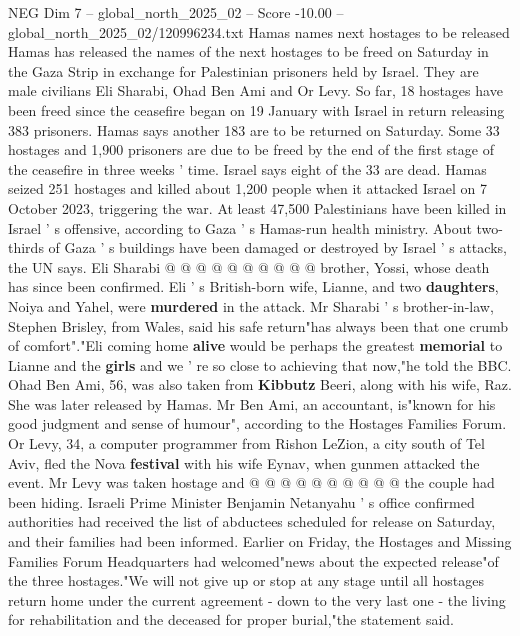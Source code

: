 \begin{textsample}{NEG Dim 7 – global\_north\_2025\_02 – Score -10.00 – global\_north\_2025\_02/120996234.txt}  \label{ex:f7_neg_066}
Hamas names next hostages to be released Hamas has released the names of the next hostages to be freed on Saturday in the Gaza Strip in exchange for Palestinian prisoners held by Israel.
They are male civilians Eli Sharabi, Ohad Ben Ami and Or Levy.
So far, 18 hostages have been freed since the ceasefire began on 19 January with Israel in return releasing 383 prisoners.
Hamas says another 183 are to be returned on Saturday.
Some 33 hostages and 1,900 prisoners are due to be freed by the end of the first stage of the ceasefire in three weeks ' time.
Israel says eight of the 33 are dead.
Hamas seized 251 hostages and killed about 1,200 people when it attacked Israel on 7 October 2023, triggering the war.
At least 47,500 Palestinians have been killed in Israel ' s offensive, according to Gaza ' s Hamas-run health ministry.
About two-thirds of Gaza ' s buildings have been damaged or destroyed by Israel ' s attacks, the UN says.
Eli Sharabi @ @ @ @ @ @ @ @ @ @ brother, Yossi, whose death has since been confirmed.
Eli ' s British-born wife, Lianne, and two \textbf{daughters}, Noiya and Yahel, were \textbf{murdered} in the attack.
Mr Sharabi ' s brother-in-law, Stephen Brisley, from Wales, said his safe return"has always been that one crumb of comfort"."Eli coming home \textbf{alive} would be perhaps the greatest \textbf{memorial} to Lianne and the \textbf{girls} and we ' re so close to achieving that now,"he told the BBC.
Ohad Ben Ami, 56, was also taken from \textbf{Kibbutz} Beeri, along with his wife, Raz.
She was later released by Hamas.
Mr Ben Ami, an accountant, is"known for his good judgment and sense of humour", according to the Hostages Families Forum.
Or Levy, 34, a computer programmer from Rishon LeZion, a city south of Tel Aviv, fled the Nova \textbf{festival} with his wife Eynav, when gunmen attacked the event.
Mr Levy was taken hostage and @ @ @ @ @ @ @ @ @ @ the couple had been hiding.
Israeli Prime Minister Benjamin Netanyahu ' s office confirmed authorities had received the list of abductees scheduled for release on Saturday, and their families had been informed.
Earlier on Friday, the Hostages and Missing Families Forum Headquarters had welcomed"news about the expected release"of the three hostages."We will not give up or stop at any stage until all hostages return home under the current agreement - down to the very last one - the living for rehabilitation and the deceased for proper burial,"the statement said.

\end{textsample}
